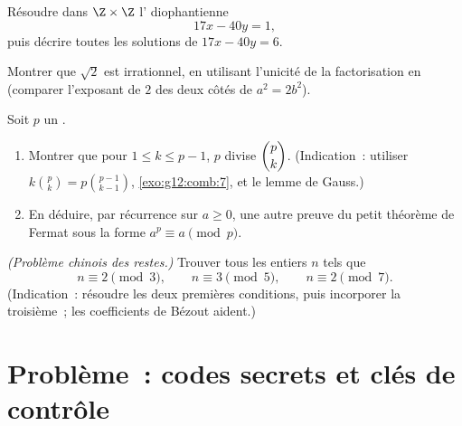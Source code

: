 \begin{exercise}[$\star\star$]\label{exo:g12:arith:7}
Résoudre dans $\Z \times \Z$ l' diophantienne
\[
17x - 40y = 1,
\]
puis décrire toutes les solutions de $17x - 40y = 6$.
\end{exercise}

\begin{exercise}[$\star\star$]\label{exo:g12:arith:8}
Montrer que $\sqrt2$ est irrationnel, en utilisant l'unicité de la
factorisation en  (comparer l'exposant de $2$ des deux côtés de
$a^2 = 2b^2$).
\end{exercise}

\begin{exercise}[$\star\star\star$]\label{exo:g12:arith:9}
Soit $p$ un .
\begin{enumerate}
  \item Montrer que pour $1 \leq k \leq p - 1$, $p$ divise $\dbinom{p}{k}$.
        (Indication~: utiliser $k\binom pk = p\binom{p-1}{k-1}$,
        \cref{exo:g12:comb:7}, et le lemme de Gauss.)
  \item En déduire, par récurrence sur $a \geq 0$, une autre preuve du petit
        théorème de Fermat sous la forme $a^p \equiv a \pmod p$.
\end{enumerate}
\end{exercise}

\begin{exercise}[$\star\star\star$]\label{exo:g12:arith:10}
\emph{(Problème chinois des restes.)} Trouver tous les entiers $n$ tels que
\[
n \equiv 2 \pmod 3, \qquad n \equiv 3 \pmod 5, \qquad n \equiv 2 \pmod 7 .
\]
(Indication~: résoudre les deux premières conditions, puis incorporer la
troisième~; les coefficients de Bézout aident.)
\end{exercise}

\section{Problème~: codes secrets et clés de contrôle}

